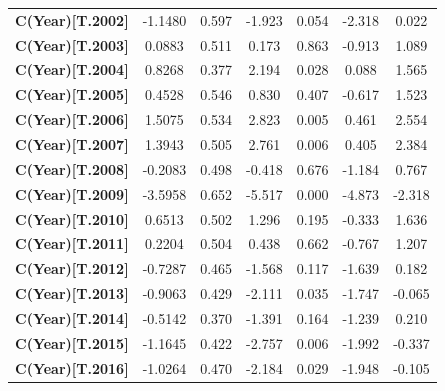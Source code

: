 \begin{center}
\begin{tabular}{lcccccc}
\textbf{C(Year)[T.2002]}         &      -1.1480  &        0.597     &    -1.923  &         0.054        &       -2.318    &        0.022     \\
\textbf{C(Year)[T.2003]}         &       0.0883  &        0.511     &     0.173  &         0.863        &       -0.913    &        1.089     \\
\textbf{C(Year)[T.2004]}         &       0.8268  &        0.377     &     2.194  &         0.028        &        0.088    &        1.565     \\
\textbf{C(Year)[T.2005]}         &       0.4528  &        0.546     &     0.830  &         0.407        &       -0.617    &        1.523     \\
\textbf{C(Year)[T.2006]}         &       1.5075  &        0.534     &     2.823  &         0.005        &        0.461    &        2.554     \\
\textbf{C(Year)[T.2007]}         &       1.3943  &        0.505     &     2.761  &         0.006        &        0.405    &        2.384     \\
\textbf{C(Year)[T.2008]}         &      -0.2083  &        0.498     &    -0.418  &         0.676        &       -1.184    &        0.767     \\
\textbf{C(Year)[T.2009]}         &      -3.5958  &        0.652     &    -5.517  &         0.000        &       -4.873    &       -2.318     \\
\textbf{C(Year)[T.2010]}         &       0.6513  &        0.502     &     1.296  &         0.195        &       -0.333    &        1.636     \\
\textbf{C(Year)[T.2011]}         &       0.2204  &        0.504     &     0.438  &         0.662        &       -0.767    &        1.207     \\
\textbf{C(Year)[T.2012]}         &      -0.7287  &        0.465     &    -1.568  &         0.117        &       -1.639    &        0.182     \\
\textbf{C(Year)[T.2013]}         &      -0.9063  &        0.429     &    -2.111  &         0.035        &       -1.747    &       -0.065     \\
\textbf{C(Year)[T.2014]}         &      -0.5142  &        0.370     &    -1.391  &         0.164        &       -1.239    &        0.210     \\
\textbf{C(Year)[T.2015]}         &      -1.1645  &        0.422     &    -2.757  &         0.006        &       -1.992    &       -0.337     \\
\textbf{C(Year)[T.2016]}         &      -1.0264  &        0.470     &    -2.184  &         0.029        &       -1.948    &       -0.105     \\

\end{tabular}
\end{center}
